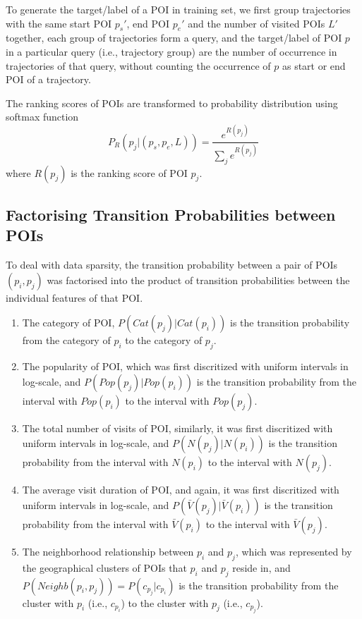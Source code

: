 To generate the target/label of a POI in training set,
we first group trajectories with the same start POI $p_s'$, end POI $p_e'$ and the number of visited POIs $L'$ together,
each group of trajectories form a query,
and the target/label of POI $p$ in a particular query (i.e., trajectory group) are the number of occurrence
in trajectories of that query, 
without counting the occurrence of $p$ as start or end POI of a trajectory.

The ranking scores of POIs are transformed to probability distribution using softmax function
\begin{displaymath}
    P_R(p_j |(p_s, p_e, L)) = \frac{e^{R(p_j)}}{\sum_j e^{R(p_j)}}
\end{displaymath}
where $R(p_j)$ is the ranking score of POI $p_j$.


\subsection{Factorising Transition Probabilities between POIs}
\label{method:transition}
To deal with data sparsity,
the transition probability between a pair of POIs $(p_i, p_j)$ was factorised into the product of
transition probabilities between the individual features of that POI.
\begin{enumerate}
\item The category of POI, $P(Cat(p_j) | Cat(p_i))$
      is the transition probability from the category of $p_i$ to the category of $p_j$.
\item The popularity of POI, which was first discritized with uniform intervals in log-scale,
      and $P(Pop(p_j) | Pop(p_i))$ is the transition probability from the interval with $Pop(p_i)$ 
      to the interval with $Pop(p_j)$.
\item The total number of visits of POI, similarly, it was first discritized with uniform intervals in log-scale,
      and $P(N(p_j) | N(p_i))$ is the transition probability from the interval with $N(p_i)$ 
      to the interval with $N(p_j)$.
\item The average visit duration of POI, and again, it was first discritized with uniform intervals in log-scale,
      and $P(\bar{V}(p_j) | \bar{V}(p_i))$ is the transition probability from the interval with $\bar{V}(p_i)$ 
      to the interval with $\bar{V}(p_j)$.
\item The neighborhood relationship between $p_i$ and $p_j$,
      which was represented by the geographical clusters of POIs that $p_i$ and $p_j$ reside in,
      and $P(Neighb(p_i, p_j)) = P(c_{p_j} | c_{p_i})$ is the transition probability from the cluster with 
      $p_i$ (i.e., $c_{p_i}$) to the cluster with $p_j$ (i.e., $c_{p_j}$).
\end{enumerate}

